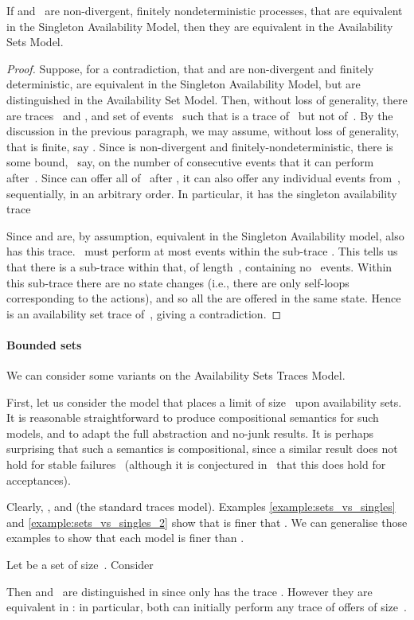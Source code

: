 \begin{prop}
\label{prop:singleton_vs_sets}
If  and~ are non-divergent, finitely nondeterministic processes, that
are equivalent in the Singleton Availability Model, then they are equivalent
in the Availability Sets Model.
\end{prop}
\begin{proof}
Suppose, for a contradiction, that  and  are non-divergent and finitely
deterministic, are equivalent in the Singleton Availability Model, but are
distinguished in the Availability Set Model.  Then, without loss of
generality, there are traces~ and , and set of events~ such that
 is a trace of~ but not of~.  By the
discussion in the previous paragraph, we may assume, without loss of
generality, that  is finite, say .  Since 
is non-divergent and finitely-nondeterministic, there is some bound, ~say,
on the number of consecutive  events that it can perform after~.
Since  can offer all of~ after , it can also offer any individual
events from~, sequentially, in an arbitrary order.  In particular, it has
the singleton availability trace

Since  and  are, by assumption, equivalent in the Singleton Availability
model,  also has this trace.  ~must perform at most   events
within the sub-trace .  This
tells us that there is a sub-trace within that, of length~, containing no
~events. Within this sub-trace there are no state changes (i.e., there
are only self-loops corresponding to the  actions), and so all the
 are offered in the same state.  Hence  is an availability set trace of~, giving a
contradiction.
\end{proof}



\paragraph{Bounded sets}
We can consider some variants on the Availability Sets Traces Model.

First, let us consider the model  that places a limit of size~ upon
availability sets.  It is reasonable straightforward to produce 
compositional semantics for such models, and to adapt the full abstraction and
no-junk results.   It is perhaps surprising that such a semantics is
compositional, since a similar result does not hold for stable
failures~\cite{BL04} (although it is conjectured in~\cite{awr:revivals} that
this does hold for acceptances). 


Clearly, , and
 (the standard traces model).
Examples \ref{example:sets_vs_singles} and \ref{example:sets_vs_singles_2}
show that  is finer that .
We can generalise those examples to show that each model  is
finer than . 
\begin{example}
\label{example:monotonic-k}
Let  be a set of size~.  Consider

Then  and~ are distinguished in  since only  has
the trace .  However they are equivalent in
: in particular, both can initially perform any trace of
offers of size~. \end{example}

